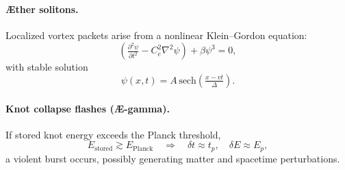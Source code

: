 \documentclass[11pt]{article}
\begin{document}
    \paragraph{\AE{}ther solitons.}
    Localized vortex packets arise from a nonlinear
    Klein–Gordon equation:
    \[
        \left( \tfrac{\partial^2 \psi}{\partial t^2}
            - C_e^2 \nabla^2 \psi \right) + \beta \psi^3 = 0,
    \]
    with stable solution
    \[
        \psi(x,t) = A\,\text{sech}\!\left(\tfrac{x - v t}{\Delta}\right).
    \]

    \paragraph{Knot collapse flashes (Æ-gamma).}
    If stored knot energy exceeds the Planck threshold,
    \[
        E_\text{stored} \gtrsim E_{\text{Planck}}
        \quad \Rightarrow \quad
        \delta t \approx t_p, \quad \delta E \approx E_p,
    \]
    a violent burst occurs, possibly generating matter and spacetime
    perturbations.
\end{document}

